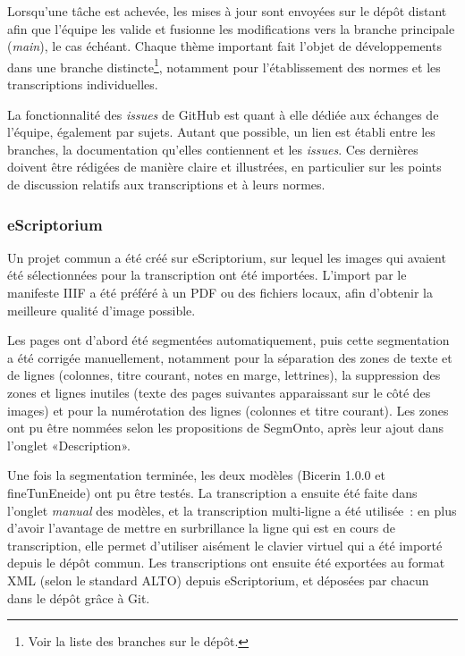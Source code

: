 \documentclass{article}
\begin{document}
Lorsqu'une tâche est achevée, les mises à jour sont envoyées sur le dépôt distant afin que l'équipe les valide et fusionne les modifications vers la branche principale (\textit{main}), le cas échéant. Chaque thème important fait l'objet de développements dans une branche distincte\footnote{Voir la liste des branches sur le dépôt.}, notamment pour l'établissement des normes et les transcriptions individuelles.
\newline


La fonctionnalité des \textit{issues} de GitHub est quant à elle dédiée aux échanges de l'équipe, également par sujets. Autant que possible, un lien est établi entre les branches, la documentation qu'elles contiennent et les \textit{issues}.
Ces dernières doivent être rédigées de manière claire et illustrées, en particulier sur les points de discussion relatifs aux transcriptions et à leurs normes.

\subsubsection{eScriptorium}

Un projet commun a été créé sur eScriptorium, sur lequel les images qui avaient été sélectionnées pour la transcription ont été importées. L’import par le manifeste IIIF a été préféré à un PDF ou des fichiers locaux, afin d’obtenir la meilleure qualité d’image possible.

Les pages ont d’abord été segmentées automatiquement, puis cette segmentation a été corrigée manuellement, notamment pour la séparation des zones de texte et de lignes (colonnes, titre courant, notes en marge, lettrines), la suppression des zones et lignes inutiles (texte des pages suivantes apparaissant sur le côté des images) et pour la numérotation des lignes (colonnes et titre courant). Les zones ont pu être nommées selon les propositions de SegmOnto, après leur ajout dans l’onglet «Description».

Une fois la segmentation terminée, les deux modèles (Bicerin 1.0.0 et fineTunEneide) ont pu être testés. La transcription a ensuite été faite dans l’onglet \textit{manual} des modèles, et la transcription multi-ligne a été utilisée~: en plus d’avoir l’avantage de mettre en surbrillance la ligne qui est en cours de transcription, elle permet d’utiliser aisément le clavier virtuel qui a été importé depuis le dépôt commun. Les transcriptions ont ensuite été exportées au format XML (selon le standard ALTO) depuis eScriptorium, et déposées par chacun dans le dépôt grâce à Git.
\end{document}
